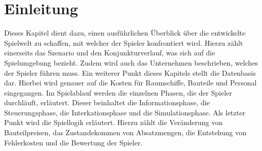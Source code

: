 \section{Einleitung}
\label{sec:spielwelt-einleitung}


Dieses Kapitel dient dazu, einen ausführlichen Überblick über die entwickelte Spielwelt zu schaffen, mit welcher der Spieler konfrontiert wird. Hierzu zählt einerseits das Szenario und den Konjunkturverlauf, was sich auf die Spielumgebung bezieht. Zudem wird auch das Unternehmen beschrieben, welches der Spieler führen muss. Ein weiterer Punkt dieses Kapitels stellt die Datenbasis dar. Hierbei wird genauer auf die Kosten für Raumschiffe, Bauteile und Personal eingegangen. Im Spielablauf werden die einzelnen Phasen, die der Spieler durchläuft, erläutert. Dieser beinhaltet die Informationsphase, die Steuerungsphase, die Interkationsphase und die Simulationsphase. Als letzter Punkt wird die Spiellogik erläutert. Hierzu zählt die Veränderung von Bauteilpreisen, das Zustandekommen von Absatzmengen, die Entstehung von Fehlerkosten und die Bewertung der Spieler.

\autorende{}

